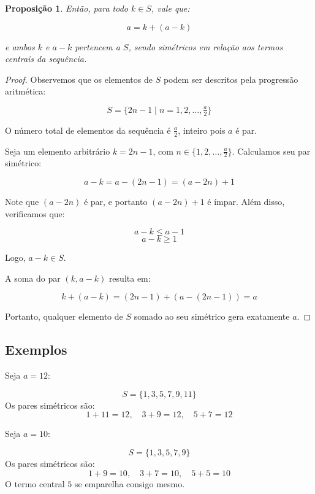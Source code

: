 \documentclass[a4paper,11pt]{article}
\newtheorem{proposition}[theorem]{Proposição}
\theoremstyle{definition}
\theoremstyle{remark}
\begin{document}
\begin{otherlanguage}{brazil}
\begin{proposition}
		Então, para todo $k \in S$, vale que:
		
		\[
		a = k + (a - k)
		\]
		
		e ambos $k$ e $a - k$ pertencem a $S$, sendo simétricos em relação aos termos centrais da sequência.
	\end{proposition}
	
	
	\begin{proof}
		Observemos que os elementos de $S$ podem ser descritos pela progressão aritmética:
		
		\[
		S = \{2n - 1 \mid n = 1, 2, \dotsc, \tfrac{a}{2} \}
		\]
		
		O número total de elementos da sequência é $\tfrac{a}{2}$, inteiro pois $a$ é par.
		
		Seja um elemento arbitrário $k = 2n - 1$, com $n \in \{1, 2, \dotsc, \tfrac{a}{2}\}$. Calculamos seu par simétrico:
		
		\[
		a - k = a - (2n - 1) = (a - 2n) + 1
		\]
		
		Note que $(a - 2n)$ é par, e portanto $(a - 2n) + 1$ é ímpar. Além disso, verificamos que:
		
		\[
		a - k \leq a - 1
		\]
		\[
		a - k \geq 1
		\]
		
		Logo, $a - k \in S$.
		
		A soma do par $(k, a - k)$ resulta em:
		
		\[
		k + (a - k) = (2n - 1) + (a - (2n - 1)) = a
		\]
		
		Portanto, qualquer elemento de $S$ somado ao seu simétrico gera exatamente $a$.
		
	\end{proof}
	
	\subsection{Exemplos}
	
	Seja $a = 12$:
	
	\[
	S = \{1, 3, 5, 7, 9, 11\}
	\]
	Os pares simétricos são:
	\[
	1 + 11 = 12, \quad 3 + 9 = 12, \quad 5 + 7 = 12
	\]
	
	Seja $a = 10$:
	
	\[
	S = \{1, 3, 5, 7, 9\}
	\]
	Os pares simétricos são:
	\[
	1 + 9 = 10, \quad 3 + 7 = 10, \quad 5 + 5 = 10
	\]
	O termo central $5$ se emparelha consigo mesmo.
	
	

\end{otherlanguage}
\end{document}
